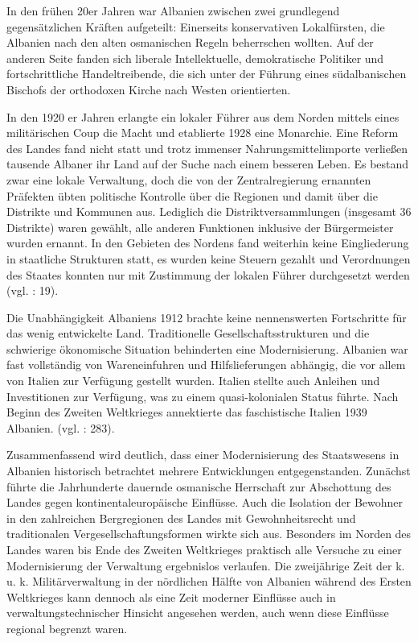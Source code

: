 In den frühen 20er Jahren war Albanien zwischen zwei grundlegend gegensätzlichen Kräften aufgeteilt: Einerseits konservativen Lokalfürsten, die Albanien nach den alten osmanischen Regeln beherrschen wollten. Auf der anderen Seite fanden sich liberale Intellektuelle, demokratische Politiker und fortschrittliche Handeltreibende, die sich unter der Führung eines südalbanischen Bischofs der orthodoxen Kirche nach Westen orientierten.\par
In den 1920 er Jahren erlangte ein lokaler Führer aus dem Norden mittels eines militärischen Coup die Macht und etablierte 1928 eine Monarchie. Eine Reform des Landes fand nicht statt und trotz immenser Nahrungsmittelimporte verließen tausende Albaner ihr Land auf der Suche nach einem besseren Leben. Es bestand zwar eine lokale Verwaltung, doch die von der Zentralregierung ernannten Präfekten übten politische Kontrolle über die Regionen und damit über die Distrikte und Kommunen aus. Lediglich die Distriktversammlungen (insgesamt 36 Distrikte) waren gewählt, alle anderen Funktionen inklusive der Bürgermeister wurden ernannt. In den Gebieten des Nordens fand weiterhin keine Eingliederung in staatliche Strukturen statt, es wurden keine Steuern gezahlt und Verordnungen des Staates konnten nur mit Zustimmung der lokalen Führer durchgesetzt werden (vgl. \cite{biber} : 19).\par
Die Unabhängigkeit Albaniens 1912 brachte keine nennenswerten Fortschritte für das wenig entwickelte Land. Traditionelle Gesellschaftsstrukturen und die schwierige ökonomische Situation behinderten eine Modernisierung. Albanien war fast vollständig von Wareneinfuhren und Hilfslieferungen abhängig, die vor allem von Italien zur Verfügung gestellt wurden. Italien stellte auch Anleihen und Investitionen zur Verfügung, was zu einem quasi-kolonialen Status führte. Nach Beginn des Zweiten Weltkrieges annektierte das faschistische Italien 1939 Albanien. (vgl. \cite{fisch84} : 283).
\par
Zusammenfassend wird deutlich, dass einer Modernisierung des Staatswesens in Albanien historisch betrachtet mehrere Entwicklungen entgegenstanden. Zunächst führte die Jahrhunderte dauernde osmanische Herrschaft zur Abschottung des Landes gegen kontinentaleuropäische Einflüsse. Auch die Isolation der Bewohner in den zahlreichen Bergregionen des Landes mit Gewohnheitsrecht und traditionalen Vergesellschaftungsformen wirkte sich aus. Besonders im Norden des Landes waren bis Ende des Zweiten Weltkrieges praktisch alle Versuche zu einer Modernisierung der Verwaltung ergebnislos verlaufen. Die zweijährige Zeit der k. u. k. Militärverwaltung in der nördlichen Hälfte von Albanien während des Ersten Weltkrieges kann dennoch als eine Zeit moderner Einflüsse auch in verwaltungstechnischer Hinsicht angesehen werden, auch wenn diese Einflüsse regional begrenzt waren.\par
